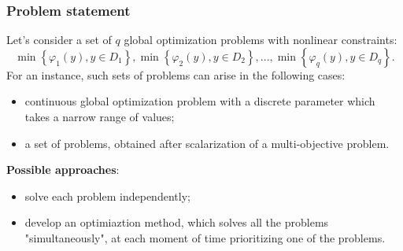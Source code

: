\documentclass[aspectratio=1610]{beamer}
\begin{document}
\begin{frame}
  \frametitle{Problem statement}
  Let's consider a set of \(q\) global optimization problems with nonlinear constraints:
  \begin{displaymath}
    \min\left\{\varphi_1(y), y\in D_1 \right\}, \min\left\{\varphi_2(y), y\in D_2\right\},..., \min\left\{\varphi_q(y), y\in D_q\right\}.
  \end{displaymath}
  For an instance, such sets of problems can arise in the following cases:
  \begin{itemize}
    \item continuous global optimization problem with a discrete parameter which takes a narrow range of values;
    \item a set of problems, obtained after scalarization of a multi-objective problem.
  \end{itemize}
\textbf{Possible approaches}:
  \begin{itemize}
    \item solve each problem independently;
    \item develop an optimiaztion method, which solves all the problems "simultaneously", at each moment of time
    prioritizing one of the problems.
  \end{itemize}
\end{frame}
\end{document}
